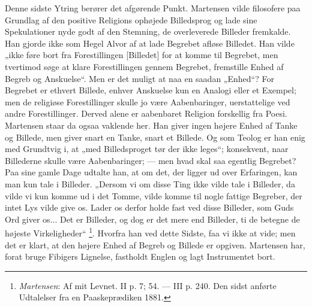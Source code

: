 \documentclass[12pt,a4paper,openany]{book}
\newcommand{\opage}[1]{\marginnote{\footnotesize\textit{[#1]}}}
\begin{document}
Denne sidste Ytring berører det afgørende Punkt. Martensen vilde filosofere paa
Grundlag af den positive Religions ophøjede Billedsprog og lade sine
Spekulationer nyde godt af den Stemning, de overleverede Billeder fremkalde.
Han gjorde ikke som Hegel Alvor af at lade Begrebet afløse Billedet. Han vilde
„ikke føre bort fra Forestillingen [Billedet] for at komme til Begrebet, men
tvertimod søge at klare Forestillingen gennem Begrebet, fremstille Enhed af
Begreb og Anskuelse“. Men er det muligt at naa en saadan „Enhed“? For Begrebet
er ethvert Billede, enhver Anskuelse kun en Analogi eller et Exempel; men de
religiøse Forestillinger skulle
\setcounter{footnote}{0}%
\opage{144}jo være Aabenbaringer, uerstattelige ved andre Forestillinger.
Derved alene er aabenbaret Religion forskellig fra Poesi. Martensen staar da
ogsaa vaklende her. Han giver ingen højere Enhed af Tanke og Billede, men giver
snart en Tanke, snart et Billede. Og som Teolog er han enig med Grundtvig i, at
„med Billedsproget tør der ikke leges“; konsekvent, naar Billederne skulle være
Aabenbaringer; --- men hvad skal saa egentlig Begrebet? Paa sine gamle Dage
udtalte han, at om det, der ligger ud over Erfaringen, kan man kun tale i
Billeder. „Dersom vi om disse Ting ikke vilde tale i Billeder, da vilde vi kun
komme ud i det Tomme, vilde komme til nogle fattige Begreber, der intet Lys
vilde give os. Lader os derfor holde fast ved disse Billeder, som Guds Ord
giver os... Det er Billeder, og dog er det mere end Billeder, ti de betegne de
højeste Virkeligheder“%
\footnote[1]{\emph{Martensen}: Af mit Levnet. II p. 7; 54. --- III p. 240. Den
sidst anførte Udtalelser fra en Paaskeprædiken 1881.}. Hvorfra han ved dette
Sidste, faa vi ikke at vide; men det er klart, at den højere Enhed af Begreb og
Billede er opgiven. Martensen har, forat bruge Fibigers Lignelse, fastholdt
Englen og lagt Instrumentet bort.
\end{document}
